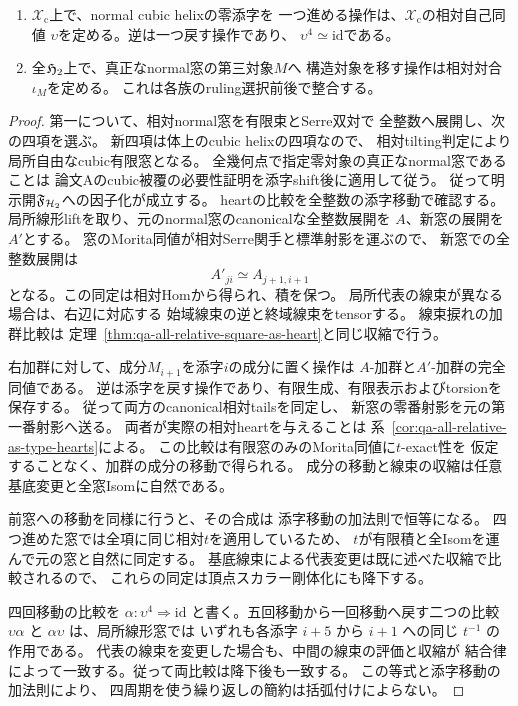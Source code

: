 \begin{proposition}[二つの相対再標識操作]
\label{prop:qa-all-as-relative-repointing-maps}
\begin{enumerate}
\item $\mathcal X_{\mathrm c}$上で、normal cubic helixの零添字を
一つ進める操作は、$\mathcal X_{\mathrm c}$の相対自己同値
$\upsilon$を定める。逆は一つ戻す操作であり、
$\upsilon^4\simeq\mathrm{id}$である。
\item 全$\mathfrak H_2$上で、真正なnormal窓の第三対象$M$へ
構造対象を移す操作は相対対合$\iota_M$を定める。
これは各族のruling選択前後で整合する。
\end{enumerate}
\end{proposition}
\begin{proof}
第一について、相対normal窓を有限束とSerre双対で
全整数へ展開し、次の四項を選ぶ。
新四項は体上のcubic helixの四項なので、
相対tilting判定により局所自由なcubic有限窓となる。
全幾何点で指定零対象の真正なnormal窓であることは
論文Aのcubic被覆の必要性証明を添字shift後に適用して従う。
従って明示開$\mathfrak F_{\mathcal H_2}$への因子化が成立する。
heartの比較を全整数の添字移動で確認する。
局所線形liftを取り、元のnormal窓のcanonicalな全整数展開を
$A$、新窓の展開を$A'$とする。
窓のMorita同値が相対Serre関手と標準射影を運ぶので、
新窓での全整数展開は
\[
 A'_{ji}\simeq A_{j+1,i+1}
\]
となる。この同定は相対Homから得られ、積を保つ。
局所代表の線束が異なる場合は、右辺に対応する
始域線束の逆と終域線束をtensorする。
線束捩れの加群比較は
定理~\ref{thm:qa-all-relative-square-as-heart}と同じ収縮で行う。

右加群に対して、成分$M_{i+1}$を添字$i$の成分に置く操作は
$A$-加群と$A'$-加群の完全同値である。
逆は添字を戻す操作であり、有限生成、有限表示およびtorsionを保存する。
従って両方のcanonical相対tailsを同定し、
新窓の零番射影を元の第一番射影へ送る。
両者が実際の相対heartを与えることは
系~\ref{cor:qa-all-relative-as-type-hearts}による。
この比較は有限窓のみのMorita同値に$t$-exact性を
仮定することなく、加群の成分の移動で得られる。
成分の移動と線束の収縮は任意基底変更と全窓Isomに自然である。

前窓への移動を同様に行うと、その合成は
添字移動の加法則で恒等になる。
四つ進めた窓では全項に同じ相対$t$を適用しているため、
$t$が有限積と全Isomを運んで元の窓と自然に同定する。
基底線束による代表変更は既に述べた収縮で比較されるので、
これらの同定は頂点スカラー剛体化にも降下する。

四回移動の比較を $\alpha:\upsilon^4\Rightarrow\mathrm{id}$
と書く。五回移動から一回移動へ戻す二つの比較
$\upsilon\alpha$ と $\alpha\upsilon$ は、局所線形窓では
いずれも各添字 $i+5$ から $i+1$ への同じ $t^{-1}$ の作用である。
代表の線束を変更した場合も、中間の線束の評価と収縮が
結合律によって一致する。従って両比較は降下後も一致する。
この等式と添字移動の加法則により、
四周期を使う繰り返しの簡約は括弧付けによらない。


\end{proof}
